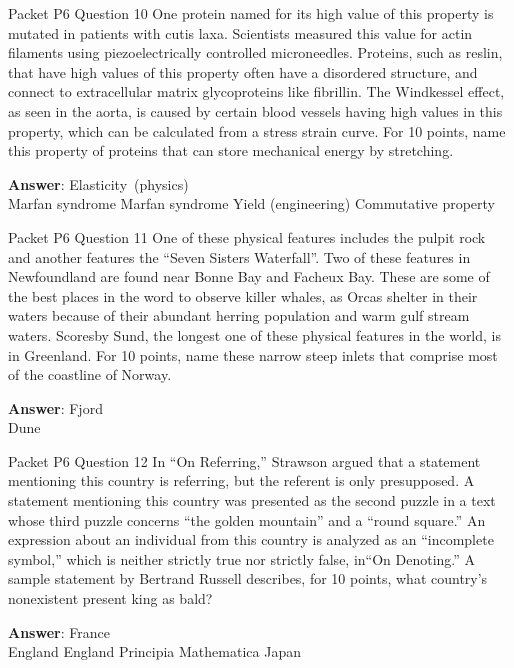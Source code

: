 \begin{frame}{Packet P6 Question 10}
One protein named for its high value of this property is mutated in patients with cutis laxa. Scientists measured this value for actin filaments using piezoelectrically controlled microneedles. Proteins, such as reslin, that have high values of this property often have a disordered structure, and connect to extracellular matrix glycoproteins like fibrillin. The Windkessel effect, as seen in the aorta, is caused by certain   blood vessels having high values in this property, which can be calculated from a stress strain curve. For 10 points, name this property of proteins that can   store mechanical energy by stretching.      

\textbf{Answer}: Elasticity\ (physics)\\
 Marfan syndrome
 Marfan syndrome
 Yield (engineering)
 Commutative property
\end{frame}

\begin{frame}{Packet P6 Question 11}
One of these physical features includes the pulpit rock and another features the “Seven Sisters Waterfall”. Two of these features in Newfoundland are found near Bonne Bay and Facheux Bay. These are some of the best places in the word to observe killer whales, as Orcas shelter in their waters because of their abundant herring population and warm gulf stream waters. Scoresby Sund,   the longest one of these physical features in the world, is in Greenland. For 10 points, name these narrow steep inlets     that comprise most of the coastline of Norway.  

\textbf{Answer}: Fjord\\
 Dune
\end{frame}

\begin{frame}{Packet P6 Question 12}
In “On Referring,” Strawson argued that a statement mentioning this country is referring, but the referent is only presupposed. A statement mentioning this country was presented as the second puzzle in a text whose third puzzle concerns ``the golden mountain'' and a ``round square.'' An expression about an individual from this country is analyzed as an “incomplete symbol,” which is neither strictly true nor strictly false, in“On Denoting.” A sample statement by Bertrand Russell describes, for 10 points, what country’s nonexistent present king as bald?        

\textbf{Answer}: France\\
 England
 England
 Principia Mathematica
 Japan
\end{frame}

